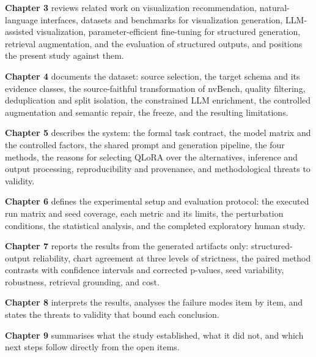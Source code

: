 \textbf{Chapter 3} reviews related work on visualization recommendation, natural-language interfaces, datasets and benchmarks for visualization generation, LLM-assisted visualization, parameter-efficient fine-tuning for structured generation, retrieval augmentation, and the evaluation of structured outputs, and positions the present study against them.

\textbf{Chapter 4} documents the dataset: source selection, the target schema and its evidence classes, the source-faithful transformation of nvBench, quality filtering, deduplication and split isolation, the constrained LLM enrichment, the controlled augmentation and semantic repair, the freeze, and the resulting limitations.

\textbf{Chapter 5} describes the system: the formal task contract, the model matrix and the controlled factors, the shared prompt and generation pipeline, the four methods, the reasons for selecting QLoRA over the alternatives, inference and output processing, reproducibility and provenance, and methodological threats to validity.

\textbf{Chapter 6} defines the experimental setup and evaluation protocol: the executed run matrix and seed coverage, each metric and its limits, the perturbation conditions, the statistical analysis, and the completed exploratory human study.

\textbf{Chapter 7} reports the results from the generated artifacts only: structured-output reliability, chart agreement at three levels of strictness, the paired method contrasts with confidence intervals and corrected p-values, seed variability, robustness, retrieval grounding, and cost.

\textbf{Chapter 8} interprets the results, analyses the failure modes item by item, and states the threats to validity that bound each conclusion.

\textbf{Chapter 9} summarises what the study established, what it did not, and which next steps follow directly from the open items.
